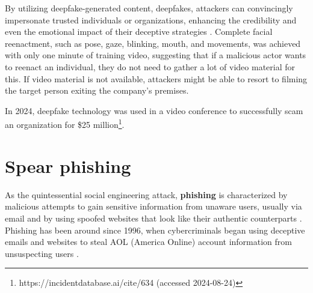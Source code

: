 By utilizing deepfake-generated content, deepfakes, attackers can convincingly impersonate trusted individuals or organizations, enhancing the credibility and even the emotional impact of their deceptive strategies \citep{mirskyTheCreationAndDetectionOfDeepfakes2021}. Complete facial reenactment, such as pose, gaze, blinking, mouth, and movements, was achieved with only one minute of training video, suggesting that if a malicious actor wants to reenact an individual, they do not need to gather a lot of video material for this. If video material is not available, attackers might be able to resort to filming the target person exiting the company's premises.

In 2024, deepfake technology was used in a video conference to successfully scam an organization for \$25 million\footnote{https://incidentdatabase.ai/cite/634 (accessed 2024-08-24)}.
















\section{Spear phishing}
\begin{comment}
Phishing & spear phishing

What to cover:
    - What is phishing (via email and ALSO other means)
    - Spear phishing a more targeted form of phishing
    - How ChatGPT can be used to improve scam messages
    - ChatGPT:n eettisten ohjeistusten ohittaminen on jo käsitelty kohdassa Chatbots

\end{comment}

As the quintessential social engineering attack, \textbf{phishing} is characterized by malicious attempts to gain sensitive information from unaware users, usually via email and by using spoofed websites that look like their authentic counterparts \citep{basitComprehensiveSurveyAIenabledPhishingAttacks2021}. Phishing has been around since 1996, when cybercriminals began using deceptive emails and websites to steal AOL (America Online) account information from unsuspecting users \citep{wangDefiningSocialEngineering2020}.

